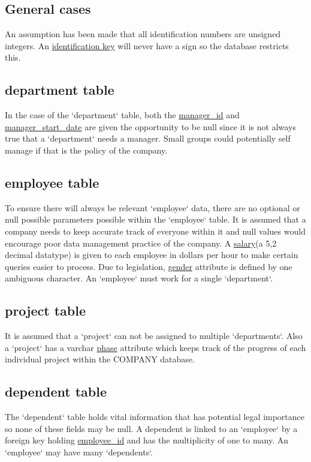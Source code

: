 \documentclass[fleqn, 11pt,letterpaper]{article}
\begin{document}
		\subsection{General cases}
	An assumption has been made that all identification numbers are unsigned integers. An \uline{identification key} will never have a sign so the database restricts this. \\	
	
	\subsection{department table}
	In the case of the `department` table, both the \uline{manager\_id} and \uline{manager\_start\_date} are given the opportunity to be null since it is not always true that a `department` needs a manager. Small groups could potentially self manage if that is the policy of the company. \\
	\subsection{employee table}
	To ensure there will always be relevant `employee` data, there are no optional or null possible parameters possible within the `employee`  table. It is assumed that a company needs to keep accurate track of everyone within it and null values would encourage poor data management practice of the company. A \uline{salary}(a 5,2 decimal datatype) is given to each employee in dollars per hour to make certain queries easier to process. Due to legislation, \uline{gender} attribute is defined by one ambiguous character. An `employee` must work for a single `department`.\\
	
		\subsection{project table}
	 It is assumed that a `project` can not be assigned to multiple `departments`. Also a `project` has a varchar \uline{phase} attribute which keeps track of the progress of each individual project within the COMPANY database.\\

		\subsection{dependent table}
The `dependent` table holds vital information that has potential legal importance so none of these fields may be null. A dependent is linked to an `employee` by a foreign key holding \uline{employee\_id} and has the multiplicity of one to many. An `employee` may have many `dependents`. \\
\end{document}
